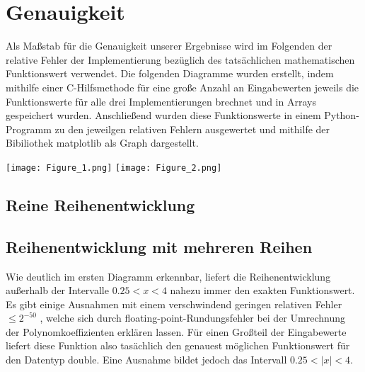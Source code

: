 \documentclass[course=erap] {aspdoc}
\begin{document}
    \section{Genauigkeit}
    Als Maßstab für die Genauigkeit unserer Ergebnisse wird im Folgenden der relative Fehler der Implementierung bezüglich des tatsächlichen mathematischen Funktionswert verwendet. Die folgenden Diagramme wurden erstellt, indem mithilfe einer C-Hilfsmethode für eine große Anzahl an Eingabewerten jeweils die Funktionswerte für alle drei Implementierungen brechnet und in Arrays gespeichert wurden. Anschließend wurden diese Funktionswerte in einem Python-Programm zu den jeweilgen relativen Fehlern ausgewertet und mithilfe der Bibiliothek matplotlib als Graph dargestellt.

    \texttt{[image: Figure\_1.png]}
    \texttt{[image: Figure\_2.png]}
    
    \subsection{Reine Reihenentwicklung}
    


    
    \subsection{Reihenentwicklung mit mehreren Reihen}
    Wie deutlich im ersten Diagramm erkennbar, liefert die Reihenentwicklung außerhalb der Intervalle $0.25<x<4$ nahezu immer den exakten Funktionswert. Es gibt einige Ausnahmen mit einem verschwindend geringen relativen Fehler $\leq2^{-50}$ , welche sich durch floating-point-Rundungsfehler bei der Umrechnung der Polynomkoeffizienten erklären lassen.
    Für einen Großteil der Eingabewerte liefert diese Funktion also tasächlich den genauest möglichen Funktionswert für den Datentyp double. Eine Ausnahme bildet jedoch das Intervall $0.25<|x|<4$. 
    
\end{document}
